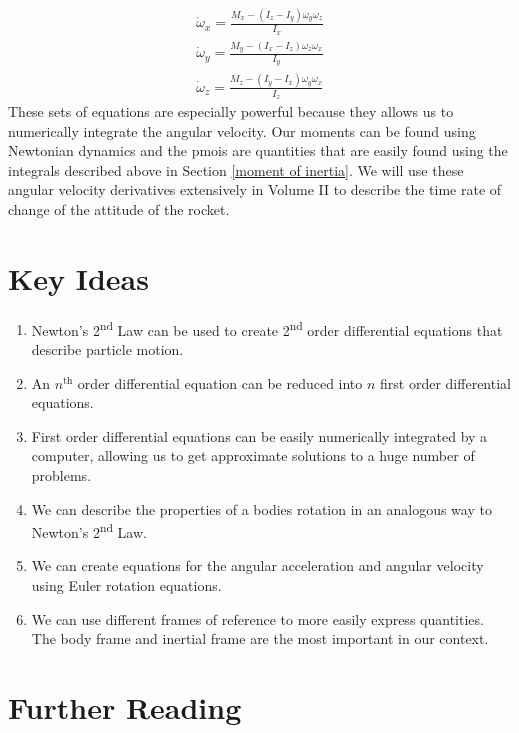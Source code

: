 \documentclass[12pt]{report}
\begin{document}
\begin{gather}\label{eq: moment eq 2}
    \dot{\omega}_x=\frac{M_x-\left(I_z-I_y\right)\omega_y\omega_z}{I_x}\\
    \dot{\omega}_y=\frac{M_y-\left(I_x-I_z\right)\omega_z\omega_x}{I_y}\\
    \dot{\omega}_z=\frac{M_z-\left(I_y-I_x\right)\omega_y\omega_x}{I_z}
\end{gather}
These sets of equations are especially powerful because they allows us to numerically integrate the angular velocity. Our moments can be found using Newtonian dynamics and the \glspl{pmoi} are quantities that are easily found using the integrals described above in Section \ref{moment of inertia}. We will use these angular velocity derivatives extensively in Volume II to describe the time rate of change of the attitude of the rocket.

\section{Key Ideas}
\begin{enumerate}
    \item Newton's 2\textsuperscript{nd} Law can be used to create 2\textsuperscript{nd} order differential equations that describe particle motion.
    \item An $n^{\mathrm{th}}$ order differential equation can be reduced into $n$ first order differential equations.
    \item First order differential equations can be easily numerically integrated by a computer, allowing us to get approximate solutions to a huge number of problems.
    \item We can describe the properties of a bodies rotation in an analogous way to Newton's 2\textsuperscript{nd} Law.
    \item We can create equations for the angular acceleration and angular velocity using Euler rotation equations.
    \item We can use different frames of reference to more easily express quantities. The \gls{body frame} and \gls{inertial frame} are the most important in our context.
    
\end{enumerate}

\section{Further Reading}
\end{document}

